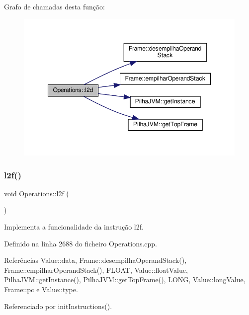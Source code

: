 Grafo de chamadas desta função\+:\nopagebreak
\begin{figure}[H]
\begin{center}
\leavevmode
\includegraphics[width=348pt]{classOperations_aab1532a2f22ab943a1ec37e33ae742b3_cgraph}
\end{center}
\end{figure}
\mbox{\label{classOperations_af2064cce9ba6f6a4be257354f21f537e}} 
\subsubsection{\texorpdfstring{l2f()}{l2f()}}
{\footnotesize\ttfamily void Operations\+::l2f (\begin{DoxyParamCaption}{ }\end{DoxyParamCaption})\hspace{0.3cm}{\ttfamily [private]}}



Implementa a funcionalidade da instrução l2f. 



Definido na linha 2688 do ficheiro Operations.\+cpp.



Referências Value\+::data, Frame\+::desempilha\+Operand\+Stack(), Frame\+::empilhar\+Operand\+Stack(), F\+L\+O\+AT, Value\+::float\+Value, Pilha\+J\+V\+M\+::get\+Instance(), Pilha\+J\+V\+M\+::get\+Top\+Frame(), L\+O\+NG, Value\+::long\+Value, Frame\+::pc e Value\+::type.



Referenciado por init\+Instructions().

